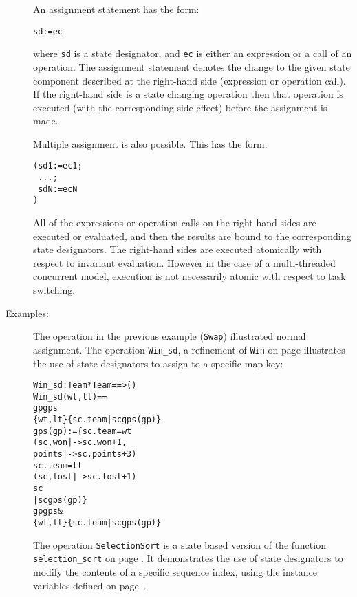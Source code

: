 \documentclass[\pformat,12pt]{article}
\begin{document}
\begin{description}
  An assignment statement has the form:
  \begin{alltt}
    sd := ec
  \end{alltt}
  where {\tt sd} is a state designator, and {\tt ec} is either an
  expression or a call of an operation. The assignment statement denotes the
  change to the given state component described at the right-hand side
  (expression or operation call). If the right-hand side is a state
  changing operation then that operation is executed (with the
  corresponding side effect) before the assignment is made.


  Multiple assignment is also possible. This has the form:
  \begin{alltt}
     (sd1 := ec1;
\           ...;
\           sdN := ecN
           )
  \end{alltt}
  All of the expressions or operation calls on the right hand sides are
  executed or evaluated, and then the results are bound to the
  corresponding state designators. The right-hand sides are executed
  atomically with respect to invariant evaluation. 
 However in the case
  of a multi-threaded concurrent model, execution is not necessarily
  atomic with respect to task switching.

\item[Examples:] The operation in the previous example (\texttt{Swap}) 
  illustrated normal assignment. The operation \texttt{Win\_sd}, a 
  refinement of \texttt{Win} on page \pageref{winDef} illustrates the use of 
  state designators to assign to a specific map key:
  \begin{alltt}
  Win_sd : Team * Team ==> ()
  Win_sd (wt,lt) ==
     gp  gps  
        \{wt,lt\}  \{sc.team | sc  gps(gp)\}
     gps(gp) := \{  sc.team = wt
                   (sc, won |-> sc.won + 1,
                               points |-> sc.points + 3)
                    sc.team = lt
                   (sc, lost |-> sc.lost + 1)
                    sc 
                 | sc  gps(gp)\}
    gp  gps & 
                 \{wt,lt\}  \{sc.team | sc  gps(gp)\}
  \end{alltt}
  The operation \texttt{SelectionSort} is a state based version of the 
  function \texttt{selection\_sort} on page \pageref{selectionSortdef}. It 
  demonstrates the use of state designators to modify the contents of a 
  specific sequence index, using the 
instance variables
 defined on page~\pageref{stdef}. 
  \begin{alltt}
 

\end{alltt}
\end{description}
\end{document}
